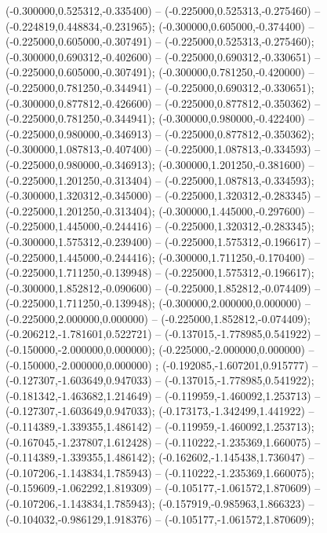  (-0.300000,0.525312,-0.335400) -- (-0.225000,0.525313,-0.275460) -- (-0.224819,0.448834,-0.231965);
 (-0.300000,0.605000,-0.374400) -- (-0.225000,0.605000,-0.307491) -- (-0.225000,0.525313,-0.275460);
 (-0.300000,0.690312,-0.402600) -- (-0.225000,0.690312,-0.330651) -- (-0.225000,0.605000,-0.307491);
 (-0.300000,0.781250,-0.420000) -- (-0.225000,0.781250,-0.344941) -- (-0.225000,0.690312,-0.330651);
 (-0.300000,0.877812,-0.426600) -- (-0.225000,0.877812,-0.350362) -- (-0.225000,0.781250,-0.344941);
 (-0.300000,0.980000,-0.422400) -- (-0.225000,0.980000,-0.346913) -- (-0.225000,0.877812,-0.350362);
 (-0.300000,1.087813,-0.407400) -- (-0.225000,1.087813,-0.334593) -- (-0.225000,0.980000,-0.346913);
 (-0.300000,1.201250,-0.381600) -- (-0.225000,1.201250,-0.313404) -- (-0.225000,1.087813,-0.334593);
 (-0.300000,1.320312,-0.345000) -- (-0.225000,1.320312,-0.283345) -- (-0.225000,1.201250,-0.313404);
 (-0.300000,1.445000,-0.297600) -- (-0.225000,1.445000,-0.244416) -- (-0.225000,1.320312,-0.283345);
 (-0.300000,1.575312,-0.239400) -- (-0.225000,1.575312,-0.196617) -- (-0.225000,1.445000,-0.244416);
 (-0.300000,1.711250,-0.170400) -- (-0.225000,1.711250,-0.139948) -- (-0.225000,1.575312,-0.196617);
 (-0.300000,1.852812,-0.090600) -- (-0.225000,1.852812,-0.074409) -- (-0.225000,1.711250,-0.139948);
 (-0.300000,2.000000,0.000000) -- (-0.225000,2.000000,0.000000) -- (-0.225000,1.852812,-0.074409);
 (-0.206212,-1.781601,0.522721) -- (-0.137015,-1.778985,0.541922) -- (-0.150000,-2.000000,0.000000);
 (-0.225000,-2.000000,0.000000) -- (-0.150000,-2.000000,0.000000) ;
 (-0.192085,-1.607201,0.915777) -- (-0.127307,-1.603649,0.947033) -- (-0.137015,-1.778985,0.541922);
 (-0.181342,-1.463682,1.214649) -- (-0.119959,-1.460092,1.253713) -- (-0.127307,-1.603649,0.947033);
 (-0.173173,-1.342499,1.441922) -- (-0.114389,-1.339355,1.486142) -- (-0.119959,-1.460092,1.253713);
 (-0.167045,-1.237807,1.612428) -- (-0.110222,-1.235369,1.660075) -- (-0.114389,-1.339355,1.486142);
 (-0.162602,-1.145438,1.736047) -- (-0.107206,-1.143834,1.785943) -- (-0.110222,-1.235369,1.660075);
 (-0.159609,-1.062292,1.819309) -- (-0.105177,-1.061572,1.870609) -- (-0.107206,-1.143834,1.785943);
 (-0.157919,-0.985963,1.866323) -- (-0.104032,-0.986129,1.918376) -- (-0.105177,-1.061572,1.870609);
